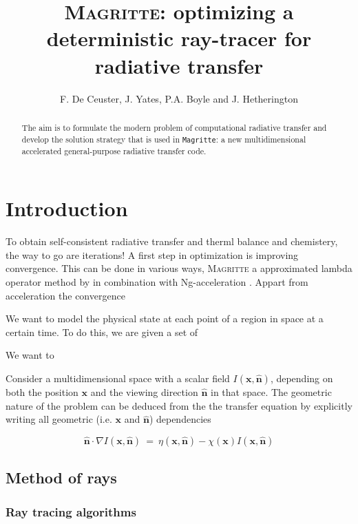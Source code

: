 \documentclass[]{article}
\title{\textsc{Magritte}: optimizing a deterministic ray-tracer for radiative transfer}
\author{F. De Ceuster, J. Yates, P.A. Boyle and J. Hetherington}
\date{}
\newcommand{\x}{\textbf{x}}
\newcommand{\n}{\hat{\textbf{n}}}
\newcommand{\e}{ \ = \ }
\newcommand{\Magritte}{\texttt{Magritte}}
\begin{document}
\maketitle


\begin{abstract}
The aim is to formulate the modern problem of computational radiative transfer and develop the solution strategy that is used in \Magritte: a new multidimensional accelerated general-purpose radiative transfer code.
\end{abstract}



\section{Introduction}

To obtain self-consistent radiative transfer and therml balance and chemistery, the way to go are iterations!
A first step in optimization is improving convergence. This can be done in various ways, \textsc{Magritte} a approximated lambda operator method by \cite{Rybicki1991} in combination with Ng-acceleration \cite{Ng1974}.
Appart from acceleration the convergence


We want to model the physical state at each point of a region in space at a certain time. To do this, we are given a set of

\bigskip

We want to

\bigskip

Consider a multidimensional space with a scalar field $I(\x,\n)$, depending on both the position $\x$ and the viewing direction $\n$ in that space. The geometric nature of the problem can be deduced from the the transfer equation by explicitly writing all geometric (i.e. $\x$ and $\n$) dependencies


\begin{equation}
\n \cdot \nabla I(\x,\n) \e \eta(\x,\n) - \chi(\x) I(\x,\n)
\end{equation}


\subsection{Method of rays}

\subsubsection{Ray tracing algorithms}
\end{document}
